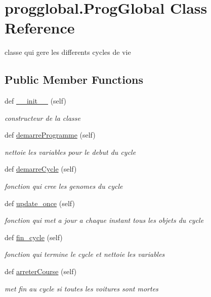\hypertarget{classprogglobal_1_1_prog_global}{}\section{progglobal.\+Prog\+Global Class Reference}
\label{classprogglobal_1_1_prog_global}


classe qui gere les differents cycles de vie  


\subsection*{Public Member Functions}
\begin{DoxyCompactItemize}
\item 
def \hyperlink{classprogglobal_1_1_prog_global_a58f0d1e91fb19db93259697d6c28fb92}{\+\_\+\+\_\+init\+\_\+\+\_\+} (self)
\begin{DoxyCompactList}\small\item\em constructeur de la classe \end{DoxyCompactList}\item 
def \hyperlink{classprogglobal_1_1_prog_global_a11cb363eb2fb2aa7e9edd2f1e4e9ec4d}{demarre\+Programme} (self)
\begin{DoxyCompactList}\small\item\em nettoie les variables pour le debut du cycle \end{DoxyCompactList}\item 
def \hyperlink{classprogglobal_1_1_prog_global_a7ea91ae18a8a73b4e031f9b178a79c3f}{demarre\+Cycle} (self)
\begin{DoxyCompactList}\small\item\em fonction qui cree les genomes du cycle \end{DoxyCompactList}\item 
def \hyperlink{classprogglobal_1_1_prog_global_ab3221f96c5601f1d4e12baf474fb7079}{update\+\_\+once} (self)
\begin{DoxyCompactList}\small\item\em fonction qui met a jour a chaque instant tous les objets du cycle \end{DoxyCompactList}\item 
def \hyperlink{classprogglobal_1_1_prog_global_aee583a06f39c3607557f3138fcbd1244}{fin\+\_\+cycle} (self)
\begin{DoxyCompactList}\small\item\em fonction qui termine le cycle et nettoie les variables \end{DoxyCompactList}\item 
def \hyperlink{classprogglobal_1_1_prog_global_ac5937e41f591bead912a5cc222e335ee}{arreter\+Course} (self)
\begin{DoxyCompactList}\small\item\em met fin au cycle si toutes les voitures sont mortes \end{DoxyCompactList}\end{DoxyCompactItemize}
